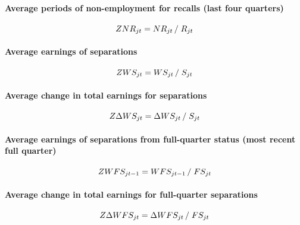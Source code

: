 \paragraph{Average periods of non-employment for recalls (last four quarters)%
}

\begin{equation}
ZNR_{jt} = {NR_{jt} } \left/ {\vphantom {{NR_{jt} } {R_{jt} }}} \right. {%
R_{jt} }
\end{equation}

\paragraph{Average earnings of separations}

\begin{equation}
ZWS_{jt} = {WS_{jt} } \left/ {\vphantom {{WS_{jt} } {S_{jt} }}} \right. {%
S_{jt} }
\end{equation}

\paragraph{Average change in total earnings for separations}

\begin{equation}
Z\Delta WS_{jt} = {\Delta WS_{jt} } \left/ {\vphantom {{\Delta WS_{jt} }
{S_{jt} }}} \right. {S_{jt} }
\end{equation}

\paragraph{Average earnings of separations from full-quarter status (most
recent full quarter)}

\begin{equation}
ZWFS_{jt - 1} = {WFS_{jt - 1} } \left/ {\vphantom {{WFS_{jt - 1} } {FS_{jt}
}}} \right. {FS_{jt} }
\end{equation}

\paragraph{Average change in total earnings for full-quarter separations}

\begin{equation}
Z\Delta WFS_{jt} = {\Delta WFS_{jt} } \left/ {\vphantom {{\Delta WFS_{jt} }
{FS_{jt} }}} \right. {FS_{jt} }
\end{equation}

